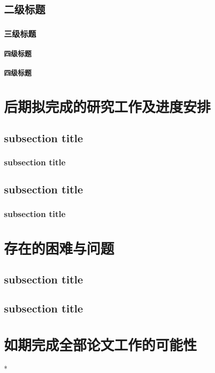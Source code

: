 \subsection{二级标题}
\subsubsection{三级标题}
\paragraph{四级标题}
\lipsum[2]
\paragraph{四级标题}
\lipsum[3]

\section{后期拟完成的研究工作及进度安排}

\subsection{subsection title}
\subsubsection{subsection title}
\lipsum[2-3]
\subsection{subsection title}
\subsubsection{subsection title}
\lipsum[4-5]

\section{存在的困难与问题}

\subsection{subsection title}
\lipsum[2-3]
\subsection{subsection title}
\lipsum[4-5]

\section{如期完成全部论文工作的可能性}*

